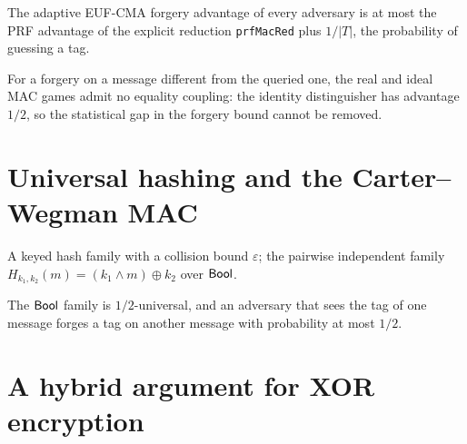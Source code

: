 \begin{theorem}
  \label{thm:prfmac-bound}
  \leanok
  The adaptive EUF-CMA forgery advantage of every adversary is at most the PRF
  advantage of the explicit reduction \texttt{prfMacRed} plus $1/|T|$, the
  probability of guessing a tag.
\end{theorem}

\begin{theorem}
  \label{thm:prfmac-no-coupling}
  \leanok
  For a forgery on a message different from the queried one, the real and ideal
  MAC games admit no equality coupling: the identity distinguisher has advantage
  $1/2$, so the statistical gap in the forgery bound cannot be removed.
\end{theorem}

\section{Universal hashing and the Carter--Wegman MAC}

\begin{definition}
  \label{def:uhf}
  \leanok
  A keyed hash family with a collision bound $\varepsilon$; the pairwise
  independent family $H_{k_1,k_2}(m) = (k_1 \wedge m) \oplus k_2$ over $\mathsf{Bool}$.
\end{definition}

\begin{theorem}
  \label{thm:uhf-mac}
  \leanok
  The $\mathsf{Bool}$ family is $1/2$-universal, and an adversary that sees the tag of
  one message forges a tag on another message with probability at most $1/2$.
\end{theorem}

\section{A hybrid argument for XOR encryption}

